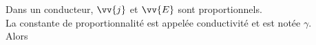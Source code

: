﻿\documentclass[a4paper]{article}
\begin{document}
\pagestyle{fancy}
\fancyhf{}
\setlength{\headheight}{15pt}

\begin{center}
	\large{}
\end{center}


Dans un conducteur, \(\vv{j}\) et \(\vv{E}\) sont proportionnels.\\
La constante de proportionnalité est appelée conductivité et est notée \(\gamma\).\\
Alors 
\end{document}

